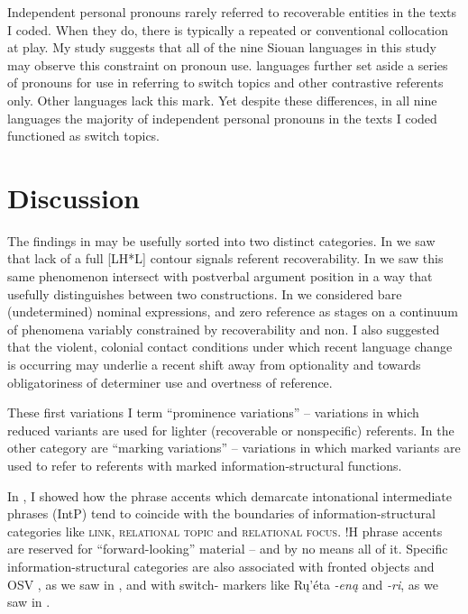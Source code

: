 \documentclass[output=paper]{LSP/langsci}
\begin{document}
	Independent personal pronouns rarely referred to recoverable entities in the texts I coded. When they do, there is typically a repeated or conventional collocation at play. My study suggests that all of the nine Siouan languages in this study may observe this constraint on pronoun use.  languages further set aside a series of pronouns for use in referring to switch topics and other contrastive referents only. Other languages lack this mark. Yet despite these differences, in all nine languages the majority of independent personal pronouns in the texts I coded functioned as switch topics.

\section{Discussion}\label{discussion}

The findings in  may be usefully sorted into two distinct categories. In  we saw that lack of a full [LH*L] contour signals referent recoverability. In  we saw this same phenomenon intersect with postverbal argument position in a way that usefully distinguishes between two constructions. In  we considered bare (undetermined) nominal expressions,  and zero reference as stages on a continuum of phenomena variably constrained by recoverability and non. I also suggested that the violent, colonial contact conditions under which recent language change is occurring may underlie a recent shift away from optionality and towards obligatoriness of determiner use and overtness of reference. 

These first variations I term “prominence variations” -- variations in which reduced variants are used for lighter (recoverable or nonspecific) referents. In the other category are “marking variations” -- variations in which marked variants are used to refer to referents with marked information-structural functions. 

In , I showed how the phrase accents which demarcate intonational intermediate phrases (IntP) tend to coincide with the boundaries of information-structural categories like \textsc{link, relational topic} and \textsc{relational focus}. !H phrase accents are reserved for “forward-looking” material -- and by no means all of it. Specific information-structural categories are also associated with fronted objects and OSV , as we saw in , and with switch- markers like Rų’éta \emph{-eną} and  \emph{-ri}, as we saw in .
\end{document}
